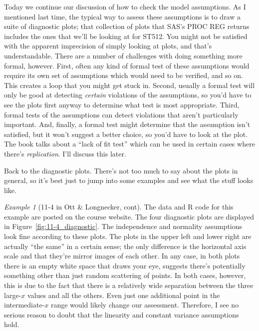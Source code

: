 \documentclass[a4paper, 12pt]{article}
\theoremstyle{plain}
\theoremstyle{definition}
\theoremstyle{remark}
\newtheorem*{example}{Example}
\begin{document}
Today we continue our discussion of how to check the model assumptions.  As I mentioned last time, the typical way to assess these assumptions is to draw a suite of diagnostic plots; that collection of plots that SAS's PROC REG returns includes the ones that we'll be looking at for ST512.  You might not be satisfied with the apparent imprecision of simply looking at plots, and that's understandable.  There are a number of challenges with doing something more formal, however.  First, often any kind of formal test of these assumptions would require its own set of assumptions which would need to be verified, and so on.  This creates a loop that you might get stuck in. Second, usually a formal test will only be good at detecting {\em certain} violations of the assumptions, so you'd have to see the plots first anyway to determine what test is most appropriate.  Third, formal tests of the assumptions can detect violations that aren't particularly important.  And, finally, a formal test might determine that the assumption isn't satisfied, but it won't suggest a better choice, so you'd have to look at the plot.  The book talks about a ``lack of fit test'' which can be used in certain cases where there's {\em replication}.  I'll discuss this later.  

Back to the diagnostic plots.  There's not too much to say about the plots in general, so it's best just to jump into some examples and see what the stuff looks like.  

\begin{example}[11-4 in Ott \& Longnecker, cont]
The data and R code for this example are posted on the course website.  The four diagnostic plots are displayed in Figure~\ref{fig:11-4_diagnostic}.  The independence and normality assumptions look fine according to these plots.  The plots in the upper left and lower right are actually ``the same'' in a certain sense; the only difference is the horizontal axis scale and that they're mirror images of each other.  In any case, in both plots there is an empty white space that draws your eye, suggests there's potentially something other than just random scattering of points.  In both cases, however, this is due to the fact that there is a relatively wide separation between the three large-$x$ values and all the others.  Even just one additional point in the intermediate-$x$ range would likely change our assessment.  Therefore, I see no serious reason to doubt that the linearity and constant variance assumptions hold.  
\end{example}
\end{document}
